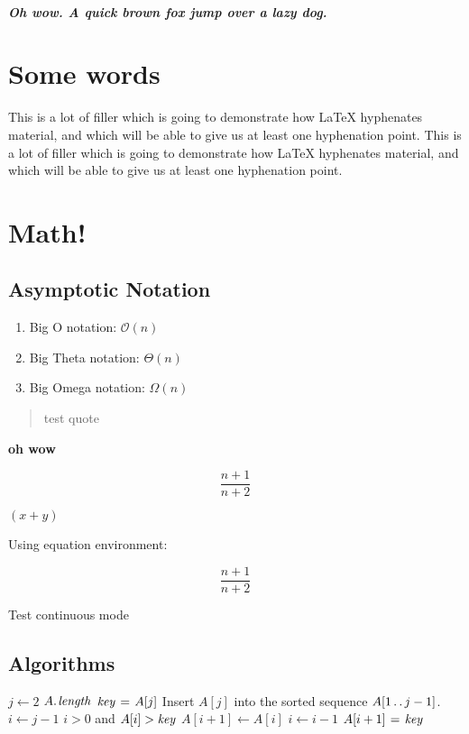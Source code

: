 \documentclass[a4paper]{article}
\begin{document}
\subparagraph{
  Oh wow. A quick brown fox jump over a lazy dog.
}

\section{Some words}

This is a lot of filler which is going to demonstrate how LaTeX hyphenates
material, and which will be able to give us at least one hyphenation point.
This is a lot of filler which is going to demonstrate how LaTeX hyphenates
material, and which will be able to give us at least one hyphenation point.

\section{Math!}

\subsection{Asymptotic Notation}

\begin{enumerate}
  \item Big O notation: $\mathcal{O}(n)$
  \item Big Theta notation: $\Theta(n)$
  \item Big Omega notation: $\Omega(n)$
\end{enumerate}

\begin{quote}
  test quote
\end{quote}

\textbf{oh wow}

\[
  \frac{n + 1}{n + 2}
\]

$\left(x + y\right)$

Using equation environment:

\begin{equation}
  \frac{n + 1}{n + 2}
\end{equation}

Test continuous mode

\subsection{Algorithms}

\begin{codebox}
\li \For $j \gets 2$ \To $\attrib{A}{length}$
\li \Do
$\id{key} \gets A[j]$
\li \Comment Insert $A[j]$ into the sorted sequence
$A[1 \mathinner{\ldotp\ldotp} j-1]$.
\li $i \gets j-1$
\li \While $i > 0$ and $A[i] > \id{key}$
\li \Do
$A[i+1] \gets A[i]$
\li $i \gets i-1$
\End
\li $A[i+1] \gets \id{key}$
\End
\end{codebox}
\end{document}
